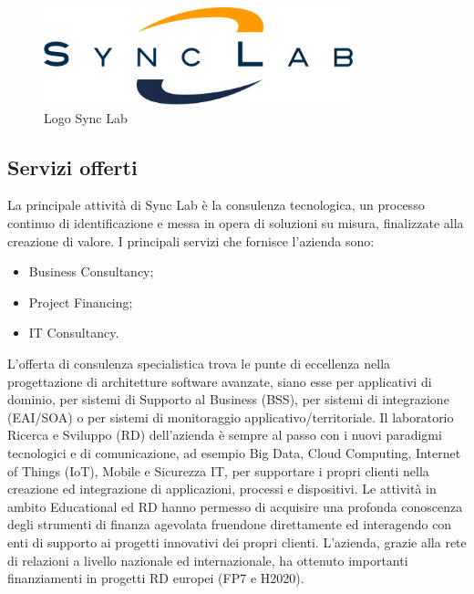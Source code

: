 \begin{figure}[h]
\caption{Logo Sync Lab}
\centering
\includegraphics[width=0.8\textwidth]{./immagini/logo-synclab.jpg}
\end{figure}

\subsection{Servizi offerti}
La principale attività di Sync Lab è la consulenza tecnologica, un processo continuo di identificazione e messa in opera di soluzioni su misura, finalizzate alla creazione di valore. I principali servizi che fornisce l'azienda sono:
\begin{itemize}
	\item{Business Consultancy;}
	\item{Project Financing;}
	\item{IT Consultancy.}
\end{itemize}
L’offerta di consulenza specialistica trova le punte di eccellenza nella progettazione di
architetture software avanzate, siano esse per applicativi di dominio, per sistemi di Supporto
al Business (BSS), per sistemi di integrazione (EAI/SOA) o per sistemi di monitoraggio applicativo/territoriale. Il laboratorio Ricerca e Sviluppo (RD) dell’azienda è sempre al passo con
i nuovi paradigmi tecnologici e di comunicazione, ad esempio Big Data, Cloud Computing,
Internet of Things (IoT), Mobile e Sicurezza IT, per supportare i propri clienti nella creazione
ed integrazione di applicazioni, processi e dispositivi. Le attività in ambito Educational ed
RD hanno permesso di acquisire una profonda conoscenza degli strumenti di finanza agevolata
fruendone direttamente ed interagendo con enti di supporto ai progetti innovativi dei propri
clienti.
L’azienda, grazie alla rete di relazioni a livello nazionale ed internazionale, ha ottenuto
importanti finanziamenti in progetti RD europei (FP7 e H2020).

